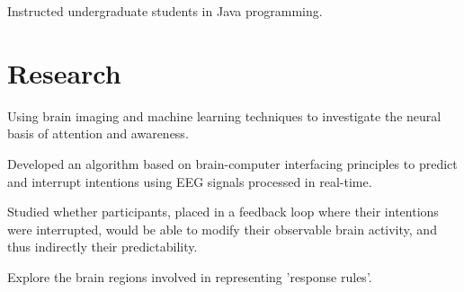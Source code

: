 \documentclass[letterpaper]{deedy-resume} %
\begin{document}
\begin{minipage}[t]{0.66\textwidth}
\vspace{\topsep} %
\begin{tightitemize}
\item Instructed undergraduate students in Java programming.
\end{tightitemize}

\sectionspace %

\section{Research}

\vspace{\topsep} %
\begin{tightitemize}
\item Using brain imaging and machine learning techniques to investigate the neural basis of attention and awareness.
\end{tightitemize}

\sectionspace %


\vspace{\topsep} %
\begin{tightitemize}
\item Developed an algorithm based on brain-computer interfacing principles to predict and interrupt intentions using EEG signals processed in real-time.
\item Studied whether participants, placed in a feedback loop where their intentions were interrupted, would be able to modify their observable brain activity, and thus indirectly their predictability.
\item Explore the brain regions involved in representing 'response rules'.
\end{tightitemize}

\sectionspace %


\end{minipage}
\end{document}
